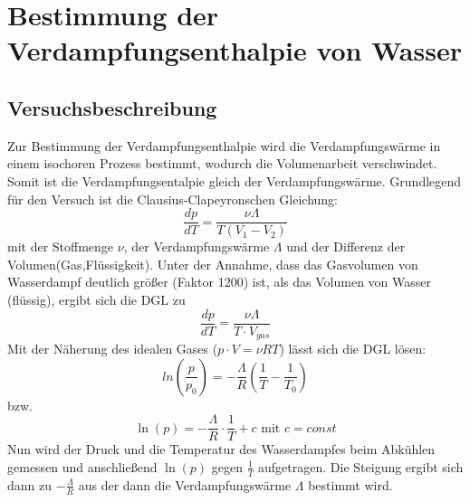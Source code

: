\documentclass[12pt,a4paper]{article}
\author{Gruppe C14 \\ Julián Häck, Martin Koytek, Lars Wenning, Erik Zimmermann}
\begin{document}
\section{Bestimmung der Verdampfungsenthalpie von Wasser}
\subsection{Versuchsbeschreibung}
Zur Bestimmung der Verdampfungsenthalpie wird die Verdampfungswärme in einem isochoren Prozess bestimmt, wodurch die Volumenarbeit verschwindet. Somit ist die Verdampfungsentalpie gleich der Verdampfungswärme. Grundlegend für den Versuch ist die Clausius-Clapeyronschen Gleichung:
\begin{equation}
\frac{dp}{dT}=\frac{\nu \Lambda}{T(V_1-V_2)}
\end{equation}
mit der Stoffmenge $\nu$, der Verdampfungswärme $\Lambda$ und der Differenz der Volumen(Gas,Flüssigkeit).
Unter der Annahme, dass das Gasvolumen von Wasserdampf deutlich größer (Faktor 1200) ist, als das Volumen von Wasser (flüssig), ergibt sich die DGL zu
\begin{equation*}
\frac{dp}{dT}=\frac{\nu \Lambda}{T\cdot V_{gas}}
\end{equation*}
Mit der Näherung des idealen Gases ($p\cdot V=\nu R T$) lässt sich die DGL lösen:
\begin{equation}
ln(\frac{p}{p_0})=-\frac{\Lambda}{R}(\frac{1}{T}-\frac{1}{T_0})
\end{equation}
bzw.
\begin{equation}
\ln(p)=-\frac{\Lambda}{R}\cdot \frac{1}{T}+c \text{ mit } c=const
\end{equation}
Nun wird der Druck und die Temperatur des Wasserdampfes beim Abkühlen gemessen und anschließend $\ln(p)$ gegen $\frac{1}{T}$ aufgetragen. Die Steigung ergibt sich dann zu $-\frac{\Lambda}{R}$ aus der dann die Verdampfungswärme $\Lambda$ bestimmt wird.
\end{document}
